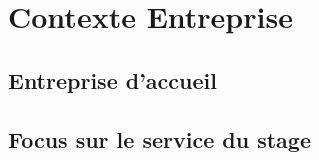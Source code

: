 \chapter{Contexte Entreprise}
\section{Entreprise d'accueil}
\section{Focus sur le service du stage}
